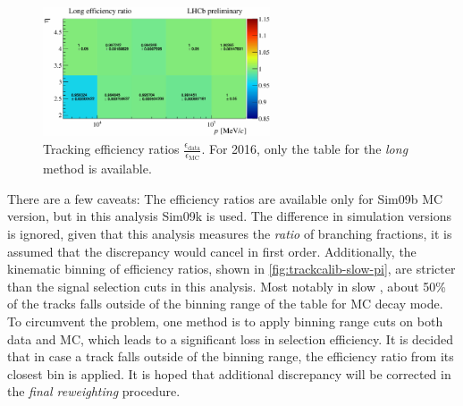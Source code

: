 \begin{figure}[htb]
    \centering
    \includegraphics[width=0.6\textwidth]{./figs-mc-correction/reweighting-tracking/tracking_eff_2016.pdf}
    \caption{
        Tracking efficiency ratios
        $\frac{\epsilon_\text{data}}{\epsilon_\text{MC}}$.
        For 2016, only the table for the \emph{long} method is available.
    }
    \label{fig:trackcalib-eff}
\end{figure}

There are a few caveats: The efficiency ratios are available only for Sim09b MC
version, but in this analysis Sim09k is used.
The difference in simulation versions is ignored, given that this analysis
measures the \emph{ratio} of branching fractions, it is assumed that the
discrepancy would cancel in first order.
Additionally, the kinematic binning of \trackcalib efficiency ratios,
shown in \cref{fig:trackcalib-slow-pi}, are stricter than the signal selection
cuts in this analysis.
Most notably in slow \pion, about 50\% of the tracks falls outside of the
binning range of the table for \Dstarp\mun MC decay mode.
To circumvent the problem, one method is to apply \trackcalib binning range cuts
on both data and MC, which leads to a significant loss in selection efficiency.
It is decided that in case a track falls outside of the binning range, the
efficiency ratio from its closest bin is applied.
It is hoped that additional discrepancy will be corrected in the
\emph{final reweighting} procedure.

